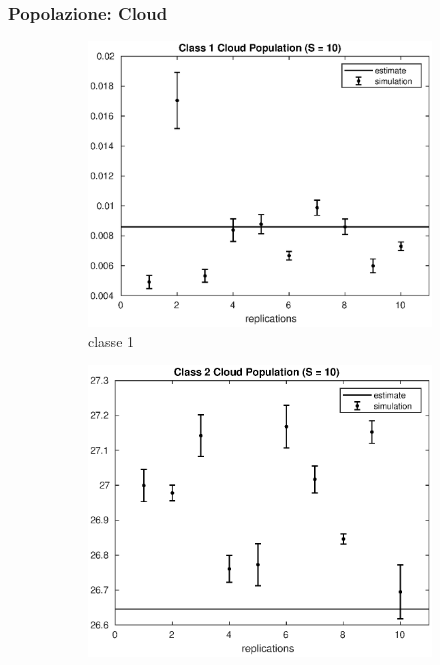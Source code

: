 \subsubsection{Popolazione: Cloud}
%
\begin{figure}[!h]
\centering
%
\begin{subfigure}[t]{0.49\textwidth}
\includegraphics[width=\textwidth]{figures/simul/10_500K_n1cloud}
\caption{classe 1}
\label{10_n1cloud}
\end{subfigure}
%
\begin{subfigure}[t]{0.49\textwidth}
\includegraphics[width=\textwidth]{figures/simul/10_500K_n2cloud}

\end{subfigure}
\end{figure}
